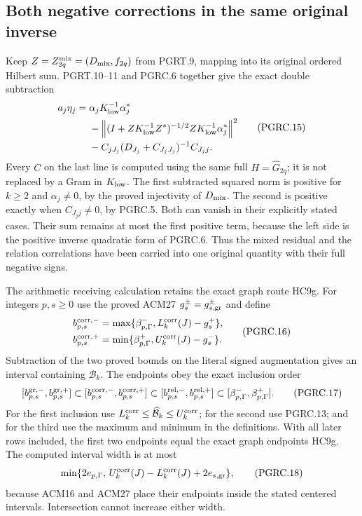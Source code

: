 \subsection{Both negative corrections in the same original inverse}

Keep $Z=Z_{2q}^{\rm mix}=(D_{\rm mix},f_{2q})$ from PGRT.9,
mapping into its original ordered Hilbert sum. PGRT.10--11 and
PGRC.6 together give the exact double subtraction
\[
 \begin{aligned}
 a_j\eta_j={}&\alpha_jK_{\rm low}^{-1}\alpha_j^*\\
 &-\left\|(I+ZK_{\rm low}^{-1}Z^*)^{-1/2}
                      ZK_{\rm low}^{-1}\alpha_j^*\right\|^2\\
 &-C_{jJ_j}(D_{J_j}+C_{J_jJ_j})^{-1}C_{J_jj}.
 \end{aligned}
 \tag{PGRC.15}\label{eq:pgrc-double-subtraction}
\]
Every $C$ on the last line is computed using the same full
$H=\widehat G_{2q}$; it is not replaced by a Gram in
$K_{\rm low}$. The first subtracted squared norm is positive
for $k\geq2$ and $\alpha_j\ne0$, by the proved injectivity of
$D_{\rm mix}$. The second is positive exactly when
$C_{J_jj}\ne0$, by PGRC.5. Both can vanish in their explicitly
stated cases. Their sum remains at most the first positive term,
because the left side is the positive inverse quadratic form
of PGRC.6. Thus the mixed residual and the relation correlations
have been carried into one original quantity with their full
negative signs.

The arithmetic receiving calculation retains the exact graph
route HC9g. For integers $p,s\geq0$ use the proved ACM27
$g_s^\pm=g_{s,\rm gr}^\pm$ and define
\[
 \begin{aligned}
 b_{p,s}^{\rm corr,-}
 &=\max\{\beta_{p,\Gamma}^-,L_k^{\rm corr}(J)-g_s^+\},\\
 b_{p,s}^{\rm corr,+}
 &=\min\{\beta_{p,\Gamma}^+,U_k^{\rm corr}(J)-g_s^-\}.
 \end{aligned}
 \tag{PGRC.16}\label{eq:pgrc-arithmetic-return}
\]
Subtraction of the two proved bounds on the literal signed
augmentation gives an interval containing $\mathcal B_k$.
The endpoints obey the exact inclusion order
\[
 [b_{p,s}^{\rm gr,-},b_{p,s}^{\rm gr,+}]
 \subset [b_{p,s}^{\rm corr,-},b_{p,s}^{\rm corr,+}]
 \subset [b_{p,s}^{\rm rel,-},b_{p,s}^{\rm rel,+}]
 \subset [\beta_{p,\Gamma}^-,\beta_{p,\Gamma}^+].
 \tag{PGRC.17}\label{eq:pgrc-nesting}
\]
For the first inclusion use
$L_k^{\rm corr}\leq\widehat{\mathcal B}_k\leq U_k^{\rm corr}$;
for the second use PGRC.13; and for the third use the maximum
and minimum in the definitions. With all later rows included,
the first two endpoints equal the exact graph endpoints HC9g.
The computed interval width is at most
\[
 \min\{2e_{p,\Gamma},\,
       U_k^{\rm corr}(J)-L_k^{\rm corr}(J)+2e_{s,\rm gr}\},
 \tag{PGRC.18}\label{eq:pgrc-arithmetic-width}
\]
because ACM16 and ACM27 place their endpoints inside the stated
centered intervals. Intersection cannot increase either width.


